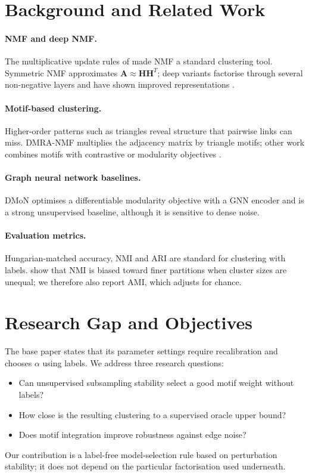 \documentclass[11pt,a4paper]{article}
\begin{document}
\section{Background and Related Work}
\paragraph{NMF and deep NMF.} The multiplicative update rules of \citet{lee1999} made NMF a
standard clustering tool. Symmetric NMF approximates $\mathbf{A}\approx\mathbf{H}\mathbf{H}^T$;
deep variants factorise through several non-negative layers and have shown improved
representations \citep{hajiveiseh2024}.

\paragraph{Motif-based clustering.} Higher-order patterns such as triangles reveal structure
that pairwise links can miss. DMRA-NMF \citep{sohrabi2026} multiplies the adjacency matrix by
triangle motifs; other work combines motifs with contrastive or modularity objectives
\citep{motifcc2024, momcd2025}.

\paragraph{Graph neural network baselines.} DMoN \citep{tsitsulin2023} optimises a
differentiable modularity objective with a GNN encoder and is a strong unsupervised
baseline, although it is sensitive to dense noise.

\paragraph{Evaluation metrics.} Hungarian-matched accuracy, NMI and ARI are standard for
clustering with labels. \citet{jerdee2025} show that NMI is biased toward finer partitions
when cluster sizes are unequal; we therefore also report AMI, which adjusts for chance.

\section{Research Gap and Objectives}
The base paper states that its parameter settings require recalibration and chooses
$\alpha$ using labels. We address three research questions:
\begin{itemize}
\item[RQ1.] Can unsupervised subsampling stability select a good motif weight without labels?
\item[RQ2.] How close is the resulting clustering to a supervised oracle upper bound?
\item[RQ3.] Does motif integration improve robustness against edge noise?
\end{itemize}
Our contribution is a label-free model-selection rule based on perturbation stability; it
does not depend on the particular factorisation used underneath.
\end{document}
